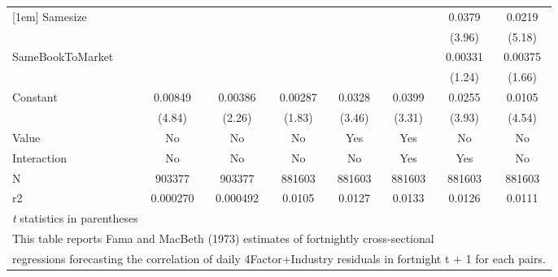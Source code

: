 {\begin{tabular}{l*{7}{c}}
[1em]
Samesize            &                     &                     &                     &                     &                     &      0.0379\sym{***}&      0.0219\sym{***}\\
                    &                     &                     &                     &                     &                     &      (3.96)         &      (5.18)         \\
[1em]
SameBookToMarket    &                     &                     &                     &                     &                     &     0.00331         &     0.00375         \\
                    &                     &                     &                     &                     &                     &      (1.24)         &      (1.66)         \\
[1em]
Constant            &     0.00849\sym{***}&     0.00386\sym{*}  &     0.00287         &      0.0328\sym{***}&      0.0399\sym{**} &      0.0255\sym{***}&      0.0105\sym{***}\\
                    &      (4.84)         &      (2.26)         &      (1.83)         &      (3.46)         &      (3.31)         &      (3.93)         &      (4.54)         \\
\hline
Value               &          No         &          No         &          No         &         Yes         &         Yes         &          No         &          No         \\
Interaction         &          No         &          No         &          No         &          No         &         Yes         &         Yes         &          No         \\
N                   &      903377         &      903377         &      881603         &      881603         &      881603         &      881603         &      881603         \\
r2                  &    0.000270         &    0.000492         &      0.0105         &      0.0127         &      0.0133         &      0.0126         &      0.0111         \\
\hline\hline
\multicolumn{8}{l}{\footnotesize \textit{t} statistics in parentheses}\\
\multicolumn{8}{l}{\footnotesize This table reports Fama and MacBeth (1973) estimates of fortnightly cross-sectional}\\
\multicolumn{8}{l}{\footnotesize  regressions forecasting the correlation of daily 4Factor+Industry residuals in fortnight t + 1 for each pairs.}\\

\end{tabular}}
